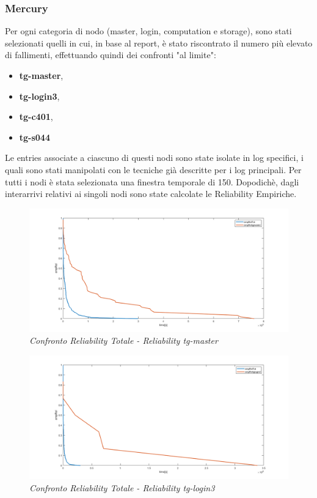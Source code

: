 \subsubsection{Mercury}
Per ogni categoria di nodo (master, login, computation e storage), sono stati selezionati quelli in cui, in base al report, è stato riscontrato il numero più elevato di fallimenti, effettuando quindi dei confronti "al limite":
\begin{itemize}
	\item \textbf{tg-master},
	\item \textbf{tg-login3},
	\item \textbf{tg-c401},
	\item \textbf{tg-s044}
\end{itemize}
Le entries associate a ciascuno di questi nodi sono state isolate in log specifici, i quali sono stati manipolati con le tecniche già descritte per i log principali. Per tutti i nodi è stata selezionata una finestra temporale di 150. Dopodichè, dagli interarrivi relativi ai singoli nodi sono state calcolate le Reliability Empiriche.
\\
\begin{figure}[H]
	\centering
	\includegraphics[width=\textwidth]{img/hw6/Rel_Tot_Tgmaster.png}
	\caption{\textit{Confronto Reliability Totale - Reliability tg-master}}
\end{figure}
\begin{figure}[H]
	\centering
	\includegraphics[width=\textwidth]{img/hw6/Rel_Tot_Tglogin.png}
	\caption{\textit{Confronto Reliability Totale - Reliability tg-login3}}
\end{figure}
